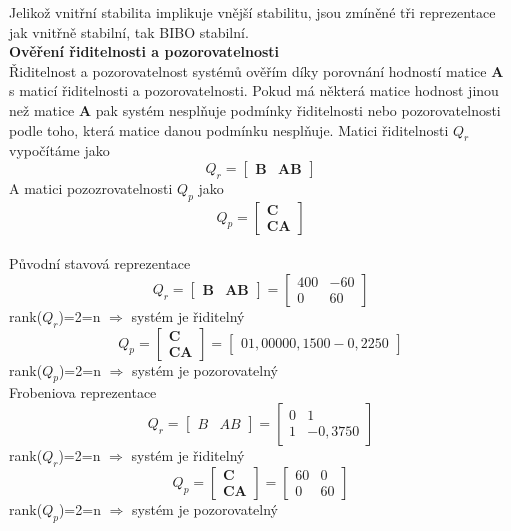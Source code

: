 \documentclass{article}
\begin{document}
			Jelikož vnitřní stabilita implikuje vnější stabilitu, jsou zmíněné tři reprezentace jak vnitřně stabilní, tak BIBO stabilní.\\
			\textbf{Ověření řiditelnosti a pozorovatelnosti}\\
			Řiditelnost a pozorovatelnost systémů ověřím díky porovnání hodností matice \textbf{A} s maticí řiditelnosti a pozorovatelnosti. Pokud má některá matice hodnost jinou než matice \(\textbf{A}\) pak systém nesplňuje podmínky řiditelnosti nebo pozorovatelnosti podle toho, která matice danou podmínku nesplňuje.
			Matici řiditelnosti \(Q_{r}\) vypočítáme jako
				\[Q_{r}=\begin{bmatrix}
					\textbf{B}&\textbf{AB}
				\end{bmatrix}\]
			A matici pozozrovatelnosti \(Q_{p}\) jako
				\[Q_{p}=\begin{bmatrix}
					\textbf{C}\\\textbf{CA}
				\end{bmatrix}\]\\
			Původní stavová reprezentace
				\[Q_{r}=\begin{bmatrix}
					\textbf{B}&\textbf{AB}
				\end{bmatrix}=\begin{bmatrix}
					400&-60\\
					0&60
				\end{bmatrix}\]\hspace{11cm}rank(\(Q_{r}\))=2=n $\Rightarrow$ systém je řiditelný
				\[Q_{p}=\begin{bmatrix}
					\textbf{C}\\\textbf{CA}
				\end{bmatrix}=\begin{bmatrix}
					     0    1,0000
					0,1500   -0,2250
				\end{bmatrix}\]\hspace{11cm}rank(\(Q_{p}\))=2=n $\Rightarrow$ systém je pozorovatelný\\
			Frobeniova reprezentace
				\[Q_{r}=\begin{bmatrix}
					B&AB
				\end{bmatrix}=\begin{bmatrix}
					0&1\\
					1&-0,3750
				\end{bmatrix}\]\hspace{11cm}rank(\(Q_{r}\))=2=n $\Rightarrow$ systém je řiditelný
				\[Q_{p}=\begin{bmatrix}
					\textbf{C}\\ \textbf{CA}
				\end{bmatrix}=\begin{bmatrix}
					60&0\\
					0&60
				\end{bmatrix}\]\hspace{11cm}rank(\(Q_{p}\))=2=n $\Rightarrow$ systém je pozorovatelný\\
\end{document}
